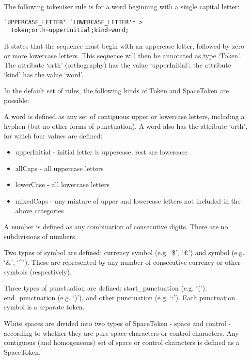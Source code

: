 \noindent
The following tokeniser rule is for a word
beginning with a single capital letter:
\begin{small}
\begin{verbatim}
`UPPERCASE_LETTER' `LOWERCASE_LETTER'* >
  Token;orth=upperInitial;kind=word;
\end{verbatim}
\end{small}
\noindent
It states that the sequence must begin with an uppercase letter,
followed by zero or more lowercase letters. This sequence will then be
annotated as type `Token'. The attribute `orth' (orthography) has
the value `upperInitial'; the attribute `kind' has the value
`word'.

In the default set of rules, the following kinds of Token and
SpaceToken are possible:

A word is defined as any set of
contiguous upper or lowercase letters, including a hyphen (but no other
forms of punctuation). A word also has the attribute `orth', for which
four values are defined:
\begin{itemize}
\item upperInitial - initial letter is uppercase, rest are lowercase
\item allCaps - all uppercase letters
\item lowerCase - all lowercase letters
\item mixedCaps - any mixture of upper and lowercase letters not
included in the above categories
\end{itemize}

A number is defined as any combination of consecutive digits. There
are no subdivisions of numbers.

Two types of symbol are defined: currency symbol (e.g. `\$', `\pounds') and
symbol (e.g. `\&', `\^{ }').
These are represented by any number of consecutive currency or other
symbols (respectively).

Three types of punctuation are defined: start\_punctuation (e.g. `('),
end\_punctuation (e.g. `)'), and other punctuation (e.g. `:'). Each
punctuation symbol is a separate token.


White spaces are divided into two types of SpaceToken - space and
control - according to whether they are pure space characters or
control characters. Any contiguous (and homogeneous) set of space or
control characters is defined as a SpaceToken.

